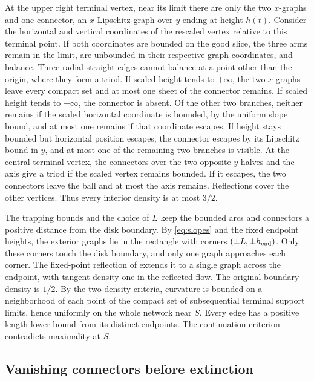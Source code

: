 At the upper right terminal vertex, near its limit there are only
the two \(x\)-graphs and one connector, an \(x\)-Lipschitz graph over
\(y\) ending at height \(h(t)\). Consider the horizontal and vertical
coordinates of the rescaled vertex relative to this terminal point.
If both coordinates are bounded on the good slice, the three arms remain in the limit,
are unbounded in their respective graph coordinates, and balance.
Three radial straight edges cannot balance at a point other than
the origin, where they form a triod. If scaled height tends to
\(+\infty\), the two \(x\)-graphs leave every compact set and at most
one sheet of the connector remains. If scaled height tends to
\(-\infty\), the connector is absent. Of the other two branches,
neither remains if the scaled horizontal coordinate is bounded,
by the uniform slope bound, and at most one remains if that
coordinate escapes. If height stays bounded but horizontal position
escapes, the connector escapes by its Lipschitz bound in \(y\), and
at most one of the remaining two branches is visible.
At the central terminal vertex, the connectors over the two opposite
\(y\)-halves and the axis give a triod if the scaled vertex remains
bounded. If it escapes, the two connectors leave the ball and at most
the axis remains. Reflections cover the other vertices. Thus every
interior density is at most \(3/2\).

The trapping bounds and the choice of \(L\) keep the bounded arcs
and connectors a positive distance from the disk boundary. By
\eqref{eq:slopes} and the fixed endpoint heights, the exterior graphs
lie in the rectangle with corners \((\pm L,\pm h_{\rm end})\).
Only these corners touch the disk boundary, and only one graph
approaches each corner. The fixed-point reflection of \cite[\S8.2]{survey} extends it to a
single graph across the endpoint, with tangent density one in the
reflected flow. The original boundary density is \(1/2\).
By the two density criteria, curvature is bounded on a neighborhood
of each point of the compact set of subsequential terminal support
limits, hence uniformly on the whole network near \(S\). Every edge
has a positive length lower bound from its distinct endpoints.
The continuation criterion \cite[Theorem~5.7]{survey} contradicts
maximality at \(S\).

\subsection{Vanishing connectors before extinction}\label{sec:early-collapse}

